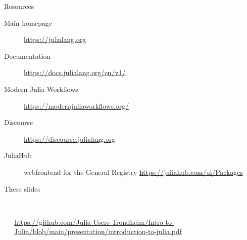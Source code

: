 \documentclass[aspectratio=169, 11pt, handout]{beamer}
\begin{document}
    \begin{frame}{Resources}
        \begin{description}
            \item[Main homepage] \url{https://julialang.org}
            \item[Documentation] \url{https://docs.julialang.org/en/v1/}
            \item[Modern Julia Workflows] \url{https://modernjuliaworkflows.org/}
            \item[Discourse] \url{https://discourse.julialang.org}
            \item[JuliaHub] webfrontend for the General Registry
            \url{https://juliahub.com/ui/Packages}
            \item[These slides]
        \end{description}
        \vspace{-1.25\baselineskip}
        \begin{columns}[T]
            \begin{column}{.075\textwidth}
            \end{column}
            \begin{column}{.64\textwidth}
                \ \\[.5\baselineskip]
                \url{https://github.com/Julia-Users-Trondheim/Intro-to-Julia/blob/main/presentation/introduction-to-julia.pdf}
            \end{column}
            \begin{column}{.33\textwidth}
            \end{column}
            \begin{column}{.005\textwidth}
            \end{column}
        \end{columns}
        \vspace{.75\baselineskip}
    \end{frame}
\end{document}
